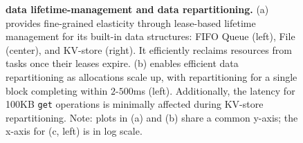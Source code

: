 \begin{figure}[t]
  \centering
  \caption[\jiffy data lifetime-management and data repartitioning]{\textbf{\jiffy data lifetime-management and data repartitioning.} (a) \jiffy provides fine-grained elasticity through lease-based lifetime management for its built-in data structures: FIFO Queue (left), File (center), and KV-store (right). It efficiently reclaims resources from tasks once their leases expire. (b) \jiffy enables efficient data repartitioning as allocations scale up, with repartitioning for a single block completing within $2$-$500$ms (left). Additionally, the latency for 100KB \texttt{get} operations is minimally affected during KV-store repartitioning. Note: plots in (a) and (b) share a common y-axis; the x-axis for (c, left) is in log scale.}
\end{figure}



